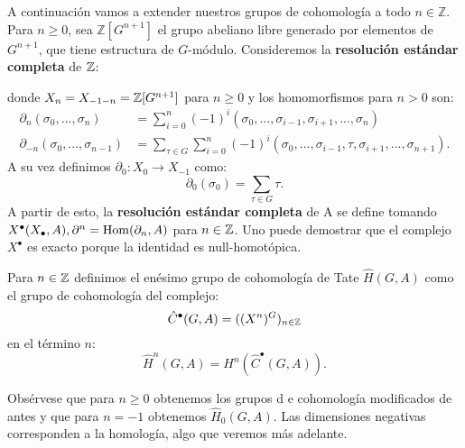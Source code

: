 \documentclass[a4paper,12pt, leqno]{article}
\begin{document}
A continuación vamos a extender nuestros grupos de cohomología a todo $n \in \mathbb{Z}$. Para $n\geq 0$, sea $\mathbb{Z}[G^{n+1}]$ el grupo abeliano libre generado por elementos de $G^{n+1}$, que tiene estructura de $G$-módulo. Consideremos la \textbf{resolución estándar completa} de $\mathbb{Z}$:
\begin{center}
\end{center}
donde $X_n=X_{-1-n}=\mathbb{Z}[G^{n+1}]$ para $n\geq 0$ y los homomorfismos para $n>0$ son:
\begin{align*}
\partial_n(\sigma_0,...,\sigma_n)&=\sum_{i=0}^{n}(-1)^i(\sigma_0,...,\sigma_{i-1},\sigma_{i+1},...,\sigma_n)\\
\partial_{-n}(\sigma_0,...,\sigma_{n-1})&=\sum_{\tau \in G}\sum_{i=0}^{n}(-1)^i(\sigma_0,...,\sigma_{i-1},\tau,\sigma_{i+1},...,\sigma_{n+1}).
\end{align*}
A su vez definimos $\partial_0: X_0 \rightarrow X_{-1}$ como:
\begin{equation*}
\partial_0(\sigma_0)=\sum_{\tau \in G}\tau.
\end{equation*}
A partir de esto, la \textbf{resolución estándar completa} de A se define tomando $X^{\bullet}(X_{\bullet},A),\partial^n= \mathrm{Hom} (\partial_n,A)$ para $n \in \mathbb{Z}$.  Uno puede demostrar que el complejo $X^{\bullet}$ es exacto porque la identidad es null-homotópica.

\begin{definicion}
	Para $n\in \mathbb{Z}$ definimos el enésimo grupo de cohomología de Tate $\hat{H}(G,A)$ como el grupo de cohomología del complejo:
	\begin{equation*}
	\hat{C}^{\bullet}(G,A)=((X^n)^G)_{n \in \mathbb{Z}}
	\end{equation*}
	en el término $n$:
	\begin{equation*}
	\hat{H}^n(G,A)=H^n(	\hat{C}^{\bullet}(G,A)).
	\end{equation*}
\end{definicion}
Obsérvese que para $n\geq 0 $ obtenemos los grupos d e cohomología modificados de antes y que para $n=-1$ obtenemos $\hat{H}_0(G,A)$. Las dimensiones negativas corresponden a la homología, algo que veremos más adelante. 
\end{document}
